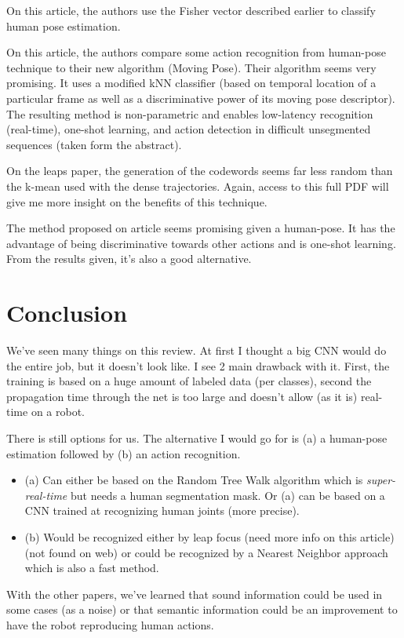 \documentclass[a4paper]{article}
\begin{document}
			On this article\cite{cheron2015p}, the authors use the Fisher vector described earlier to classify human pose estimation.

			On this article\cite{zanfir2013moving}, the authors compare some action recognition from human-pose technique to their new algorithm (Moving Pose). Their algorithm seems very promising. It uses a modified kNN classifier (based on temporal location of a particular frame as well as a discriminative power of its moving pose descriptor). The resulting method is non-parametric and enables low-latency recognition (real-time), one-shot learning, and action detection in difficult unsegmented sequences (taken form the abstract). 

			\begin{mdframed}[backgroundcolor = gray!30]
				On the leaps paper\cite{kwon2014complexity}, the generation of the codewords seems far less random than the k-mean used with the dense trajectories. Again, access to this full PDF will give me more insight on the benefits of this technique.

				The method proposed on article\cite{zanfir2013moving} seems promising given a human-pose. It has the advantage of being discriminative towards other actions and is one-shot learning. From the results given, it's also a good alternative.
			\end{mdframed}
		

		\section{Conclusion}
			We've seen many things on this review. At first I thought a big CNN would do the entire job, but it doesn't look like. I see 2 main drawback with it. First, the training is based on a huge amount of labeled data (per classes), second the propagation time through the net is too large and doesn't allow (as it is) real-time on a robot.

			There is still options for us. The alternative I would go for is (a) a human-pose estimation followed by (b) an action recognition. 
			\begin{itemize}
				\item (a) Can either be based on the Random Tree Walk\cite{yub2015random} algorithm which is \textit{super-real-time} but needs a human segmentation mask. Or (a) can be based on a CNN trained at recognizing human joints \cite{tompson2014real} (more precise).
				\item (b) Would be recognized either by leap focus \cite{kwon2014complexity} (need more info on this article) (not found on web) or could be recognized by a Nearest Neighbor approach\cite{zanfir2013moving} which is also a fast method.
			\end{itemize}

			With the other papers, we've learned that sound information could be used in some cases (as a noise) or that semantic information could be an improvement to have the robot reproducing human actions.




 
\end{document}
